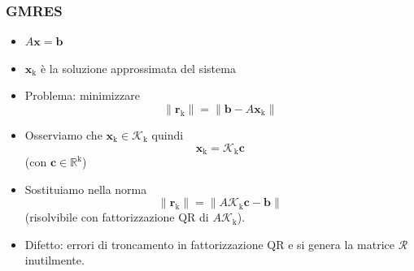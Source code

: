 \documentclass[10pt]{beamer}
\begin{document}
\begin{frame} \frametitle{GMRES} 
\begin{itemize}
    \item $A\mathbf{x} = \mathbf{b}$
\item $\mathbf{x}_\mathrm{k}$ è la \alert{soluzione approssimata} del sistema
\item Problema: \alert{minimizzare}      $$\|\mathbf{r}_\mathrm{k}\| = \|\mathbf{b} - A\mathbf{x}_\mathrm{k}\|$$
    \item Osserviamo che $\mathbf{x}_\mathrm{k} \in   \mathcal{K}_\mathrm{k}$ quindi$$\mathbf{x}_\mathrm{k} = \mathcal{K}_\mathrm{k}\mathbf{c}$$ (con $\mathbf{c} \in \mathbb{R}^\mathrm{k}$)
    \item Sostituiamo nella norma $$\|\mathbf{r}_\mathrm{k}\| = \|A\mathcal{K}_\mathrm{k}\mathbf{c} - \mathbf{b}\|$$(risolvibile con fattorizzazione QR di $A\mathcal{K}_\mathrm{k}$).
\item \alert{Difetto}: errori di troncamento in fattorizzazione QR e si genera la matrice $\mathcal{R}$ inutilmente.
\end{itemize}
\end{frame}


\end{document}
